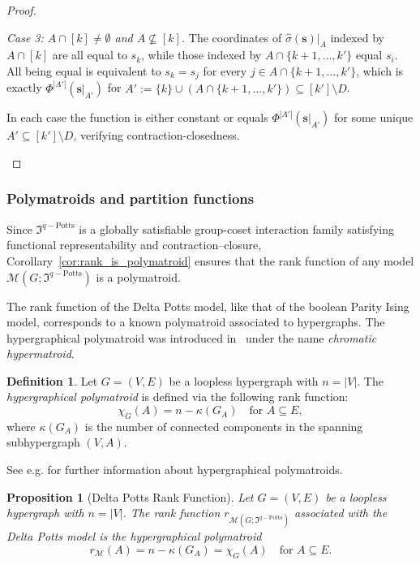 \documentclass[11pt,reqno]{amsart}
\newcommand{\vecs}{\boldsymbol{s}}
\newcommand{\Mo}{\mathcal{M}}
\newcommand{\mcp}{\mathfrak{I}^{q-\mathrm{Potts}}}
\theoremstyle{plain}
\newtheorem{proposition}[theorem]{Proposition}
\theoremstyle{definition}
\newtheorem{definition}[theorem]{Definition}
\numberwithin{equation}{section}
\begin{document}
\begin{proof}
\begin{enumerate}
\emph{Case 3: $A \cap [k] \neq \emptyset$ and $A \not\subseteq [k]$.} The
coordinates of $\hat\sigma(\vecs)|_A$ indexed by $A \cap [k]$ are all
equal to $s_k$, while those indexed by $A \cap \{k+1,\dots,k'\}$ equal
$s_i$. All being equal is equivalent to $s_k = s_j$ for every $j \in
A \cap \{k+1,\dots,k'\}$, which is exactly
$\Phi^{|A'|}(\vecs|_{A'})$ for $A' := \{k\} \cup (A \cap
\{k+1,\dots,k'\}) \subseteq [k'] \setminus D$.

In each case the function is either constant or equals
$\Phi^{|A'|}(\vecs|_{A'})$ for some unique $A' \subseteq [k'] \setminus D$,
verifying contraction-closedness. \qedhere
\end{enumerate}
\end{proof}

\subsubsection{Polymatroids and partition functions}

Since $\mcp$ is a globally satisfiable group-coset interaction family satisfying functional representability and contraction--closure, Corollary~\ref{cor:rank_is_polymatroid} ensures that the rank function of any model $\Mo(G; \mcp)$ is a polymatroid.

The rank function of the Delta Potts model, like that of the boolean Parity Ising model, corresponds to a known polymatroid associated to hypergraphs. The hypergraphical polymatroid was introduced in~\cite{Helg} under the name \emph{chromatic hypermatroid}.
\begin{definition}
    Let $G=(V,E)$ be a loopless hypergraph with $n=|V|$. The \emph{hypergraphical polymatroid} is defined via the following rank function:
    \[
    \chi_G(A) = n - \kappa(G_A) \quad \text{for } A \subseteq E,
    \]
    where $\kappa(G_A)$ is the number of connected components in the spanning subhypergraph $(V, A)$.
\end{definition}
See e.g. \cite{Vertigan_Whittle_1993} for further information about hypergraphical polymatroids.

\begin{proposition}[Delta Potts Rank Function]
\label{prop:delta_potts_rank}
    Let $G=(V,E)$ be a loopless hypergraph with $n=|V|$. The rank function $r_{\Mo(G; \mcp)}$ associated with the Delta Potts model is the hypergraphical polymatroid
    \[ r_{\Mo}(A) = n - \kappa(G_A) = \chi_G(A)  \quad \text{for } A \subseteq E. \]
\end{proposition}
\end{document}
